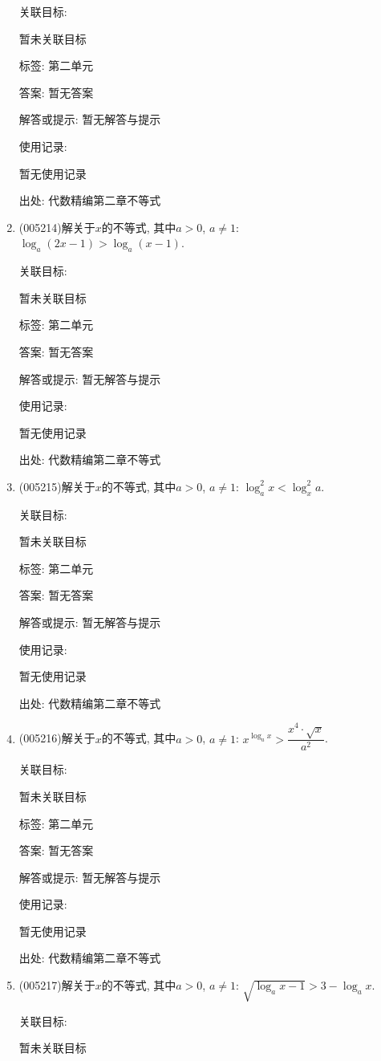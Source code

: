 \documentclass[10pt,a4paper]{article}
\begin{document}
\begin{enumerate}[1.]
关联目标:

暂未关联目标



标签: 第二单元

答案: 暂无答案

解答或提示: 暂无解答与提示

使用记录:

暂无使用记录


出处: 代数精编第二章不等式
\item { (005214)}解关于$x$的不等式, 其中$a>0$, $a\ne 1$: $\log_a(2x-1)>\log_a(x-1)$.


关联目标:

暂未关联目标



标签: 第二单元

答案: 暂无答案

解答或提示: 暂无解答与提示

使用记录:

暂无使用记录


出处: 代数精编第二章不等式
\item { (005215)}解关于$x$的不等式, 其中$a>0$, $a\ne 1$: $\log_a^2x<\log_x^2a$.


关联目标:

暂未关联目标



标签: 第二单元

答案: 暂无答案

解答或提示: 暂无解答与提示

使用记录:

暂无使用记录


出处: 代数精编第二章不等式
\item { (005216)}解关于$x$的不等式, 其中$a>0$, $a\ne 1$: ${x^{\log_ax}}>\dfrac{x^4\cdot \sqrt x}{a^2}$.


关联目标:

暂未关联目标



标签: 第二单元

答案: 暂无答案

解答或提示: 暂无解答与提示

使用记录:

暂无使用记录


出处: 代数精编第二章不等式
\item { (005217)}解关于$x$的不等式, 其中$a>0$, $a\ne 1$: $\sqrt{\log_ax-1}>3-\log_ax$.


关联目标:

暂未关联目标




\end{enumerate}
\end{document}
